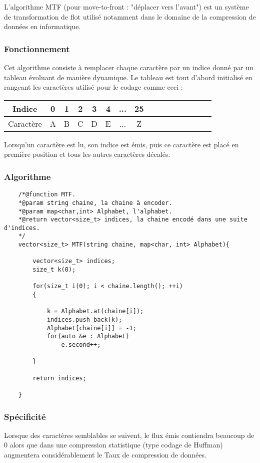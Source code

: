 \par L'algorithme MTF (pour move-to-front : "déplacer vers l'avant") est un système de transformation de flot utilisé notamment dans le domaine de la compression de données en informatique. 

\subsubsection{Fonctionnement}
\par Cet algorithme consiste à remplacer chaque caractère par un indice donné par un tableau évoluant de manière dynamique. 
Le tableau est tout d'abord initialisé en rangeant les caractères utilisé pour le codage comme ceci : \\

\begin{tabular}{|c|c|c|c|c|c|c|c|c|c|c|c|c|c|c|c|}
    \hline
    Indice & 0 & 1 & 2 & 3 & 4 & ... & 25\\
    \hline
    Caractère & A & B & C & D & E & ... & Z\\
    \hline
\end{tabular}

\par Lorsqu'un caractère est lu, son indice est émis, puis ce caractère est placé en première position et tous les autres caractères décalés.

\subsubsection{Algorithme}
\begin{verbatim}
    /*@function MTF.
    *@param string chaine, la chaine à encoder.
    *@param map<char,int> Alphabet, l'alphabet.
    *@return vector<size_t> indices, la chaine encodé dans une suite d'indices.
    */
    vector<size_t> MTF(string chaine, map<char, int> Alphabet){
	
	    vector<size_t> indices;
	    size_t k(0);

	    for(size_t i(0); i < chaine.length(); ++i)
	    {
		
		    k = Alphabet.at(chaine[i]);
		    indices.push_back(k);
		    Alphabet[chaine[i]] = -1;
		    for(auto &e : Alphabet)
	    		e.second++;
			
    	}
	
	    return indices;
	
    }
\end{verbatim}


\subsubsection{Spécificité}
\par Lorsque des caractères semblables se suivent, le flux émis contiendra beaucoup de 0 alors que dans une compression statistique (type codage de Huffman) augmentera considérablement le Taux de compression de données.

